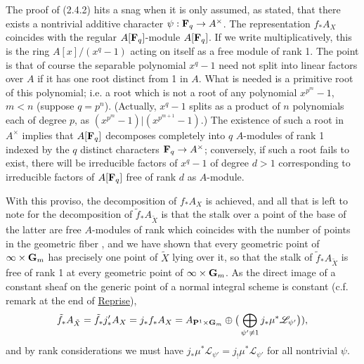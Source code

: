 \documentclass[deligne.tex]{subfiles}
\begin{document}
The proof of (2.4.2) hits a snag when it is only assumed, as stated, that
there exists a nontrivial additive character $\psi:\mathbf{F}_q\rightarrow A^\times$.
The representation $f_*A_X$ coincides with the regular $A[\mathbf{F}_q]$-module
$A[\mathbf{F}_q]$. If we write multiplicatively, this is the ring $A[x]/(x^q-1)$
acting on itself as a free module of rank 1. The point is that of course
the separable polynomial $x^q-1$ need not split into linear factors over 
$A$ if it has one root distinct from 1 in $A$. What is needed is a 
primitive root of this polynomial; i.e. a root which is not a root of any 
polynomial $x^{p^m}-1$, $m<n$ (suppose $q=p^n$). (Actually, $x^q-1$ splits 
as a product of $n$ polynomials each of degree $p$, as
$(x^{p^m}-1)|(x^{p^{m+1}}-1)$.)
The existence of such a root in $A^\times$ implies that
$A[\mathbf{F}_q]$ decomposes completely into $q$ $A$-modules of rank 1 indexed by
the $q$ distinct characters $\mathbf{F}_q\rightarrow A^\times$; conversely, if such a root
fails to exist, there will be irreducible factors of $x^q-1$ of degree 
$d>1$ corresponding to irreducible factors of $A[\mathbf{F}_q]$ free of rank $d$
as $A$-module.

With this proviso, the decomposition of $f_*A_X$ is achieved, and all
that is left to note for the decomposition of $\tilde f_*A_{\tilde X}$
is that the stalk over a point of the base of the latter are free
$A$-modules of rank which coincides with the number of points in the 
geometric fiber \cite[VIII 5.5]{SGAA}, and we have shown that every 
geometric point of $\infty\times\mathbf{G}_m$ has precisely one point of
$\tilde X$ lying over it, so that the stalk of $\tilde f_*A_{\tilde X}$ is
free of rank 1 at every geometric point of $\infty\times\mathbf{G}_m$.
As the direct image of a constant sheaf on the generic point of a normal
integral scheme is constant
(c.f. remark at the end of \hyperref[laumon:reprise]{Reprise}),
\begin{equation*}
	\tilde f_*A_{\tilde X}=\tilde f_*j'_*A_X=j_*f_*A_X
	=A_{\mathbf{P}^1\times\mathbf{G}_m}\oplus\big(\bigoplus_{\psi'\ne1}j_*\mu^*\mathscr L_{\psi'}\big)),
\end{equation*}
and by rank considerations we must have 
$j_*\mu^*\mathscr L_{\psi'}=j_!\mu^*\mathscr L_{\psi'}$ for all
nontrivial $\psi$.
\end{document}
